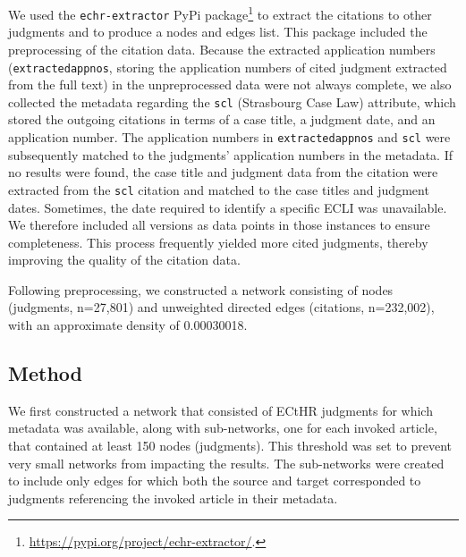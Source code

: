 \documentclass[sigconf,authordraft]{acmart}
\begin{document}
We used the \texttt{echr-extractor} PyPi package\footnote{\url{https://pypi.org/project/echr-extractor/}.} to extract the citations to other judgments and to produce a nodes and edges list. This package included the preprocessing of the citation data. Because the extracted application numbers (\texttt{extractedappnos}, storing the application numbers of cited judgment extracted from the full text) in the unpreprocessed data were not always complete, we also collected the metadata regarding the \texttt{scl} (Strasbourg Case Law) attribute, which stored the outgoing citations in terms of a case title, a judgment date, and an application number. The application numbers in \texttt{extractedappnos} and \texttt{scl} were subsequently matched to the judgments' application numbers in the metadata.
If no results were found, the case title and judgment data from the citation were extracted from the \texttt{scl} citation and matched to the case titles and judgment dates.
Sometimes, the date required to identify a specific ECLI was unavailable. We therefore included all versions as data points in those instances to ensure completeness.
This process frequently yielded more cited judgments, thereby improving the quality of the citation data.

Following preprocessing, we constructed a network consisting of nodes (judgments, n=27,801) and unweighted directed edges (citations, n=232,002), with an approximate density of 0.00030018.


\subsection{Method}

We first constructed a network that consisted of ECtHR judgments for which metadata was available, along with sub-networks, one for each invoked article, that contained at least 150 nodes (judgments). This threshold was set to prevent very small networks from impacting the results. The sub-networks were created to include only edges for which both the source and target corresponded to judgments referencing the invoked article in their metadata.
\end{document}
